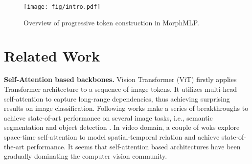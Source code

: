 \documentclass[runningheads]{llncs}
\begin{document}
 
























\begin{figure*}[t]
\begin{center}
\texttt{[image: fig/intro.pdf]}

\end{center}
\caption{
Overview of progressive token construction in MorphMLP. 
}

\label{fig:res}
\end{figure*}
























 
 



 




%
 

\section{Related Work}
\label{sec:related}

\noindent
\textbf{Self-Attention based backbones.}
Vision Transformer (ViT) \cite{vit} firstly applies Transformer architecture to a sequence of image tokens.
It utilizes multi-head self-attention to capture long-range dependencies,
thus achieving surprising results on image classification. 
 Following works\cite{swin,visualtransformer,cswin,t2t,pvt,botnet} make a series of breakthroughs to achieve state-of-art performance on several image tasks, i.e., semantic segmentation \cite{segformer,TrSeg} and object detection \cite{detr,d_detr}. In video domain, a couple of woks \cite{motionformer,timesformer,vidtr,focal,video_swin,mvit} explore space-time self-attention to model spatial-temporal relation and achieve  state-of-the-art performance.
It seems that self-attention based architectures have been gradually dominating the computer vision community.
\end{document}
